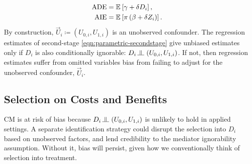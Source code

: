 \begin{align*}
    \text{ADE}
        &= \mathbb{E}_{} \left[ \gamma + \delta D_i \right], \\
    \text{AIE} 
        &= \mathbb{E}_{} \left[  \pi \left( \beta +  \delta Z_i \right) \right].
\end{align*}
By construction, $\vec U_i \coloneqq \left(U_{0, i}, U_{1, i} \right)$ is an unobserved confounder.
The regression estimates of second-stage \eqref{eqn:parametric-secondstage} give unbiased estimates only if $D_i$ is also conditionally ignorable: $D_i \indep  \left(U_{0, i}, U_{1, i} \right)$.
If not, then regression estimates suffer from omitted variables bias from failing to adjust for the unobserved confounder, $\vec U_i$.

\subsection{Selection on Costs and Benefits}
CM is at risk of bias because $D_i \indep  \left(U_{0, i}, U_{1, i} \right)$ is unlikely to hold in applied settings.
A separate identification strategy could disrupt the selection into $D_i$ based on unobserved factors, and lend credibility to the mediator ignorability assumption.
Without it, bias will persist, given how we conventionally think of selection into treatment.

